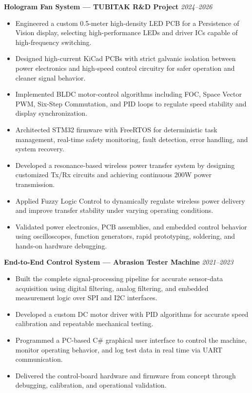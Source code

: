 \documentclass[a4paper,10pt]{article}
\newcommand{\projectheading}[2]{%
  \vspace{4pt}\noindent\textbf{#1} \hfill \textit{\small #2}\\%
}
\begin{document}
\projectheading{Hologram Fan System --- TUBITAK R\&D Project}{2024--2026}
\begin{itemize}
  \item Engineered a custom 0.5-meter high-density LED PCB for a Persistence of Vision
        display, selecting high-performance LEDs and driver ICs capable of high-frequency
        switching.
  \item Designed high-current KiCad PCBs with strict galvanic isolation between power
        electronics and high-speed control circuitry for safer operation and cleaner signal
        behavior.
  \item Implemented BLDC motor-control algorithms including FOC, Space Vector PWM,
        Six-Step Commutation, and PID loops to regulate speed stability and display
        synchronization.
  \item Architected STM32 firmware with FreeRTOS for deterministic task management,
        real-time safety monitoring, fault detection, error handling, and system recovery.
  \item Developed a resonance-based wireless power transfer system by designing customized
        Tx/Rx circuits and achieving continuous 200W power transmission.
  \item Applied Fuzzy Logic Control to dynamically regulate wireless power delivery and
        improve transfer stability under varying operating conditions.
  \item Validated power electronics, PCB assemblies, and embedded control behavior using
        oscilloscopes, function generators, rapid prototyping, soldering, and hands-on
        hardware debugging.
\end{itemize}

\projectheading{End-to-End Control System --- Abrasion Tester Machine}{2021--2023}
\begin{itemize}
  \item Built the complete signal-processing pipeline for accurate sensor-data acquisition
        using digital filtering, analog filtering, and embedded measurement logic over SPI
        and I2C interfaces.
  \item Developed a custom DC motor driver with PID algorithms for accurate speed
        calibration and repeatable mechanical testing.
  \item Programmed a PC-based C\# graphical user interface to control the machine, monitor
        operating behavior, and log test data in real time via UART communication.
  \item Delivered the control-board hardware and firmware from concept through debugging,
        calibration, and operational validation.
\end{itemize}
\end{document}
